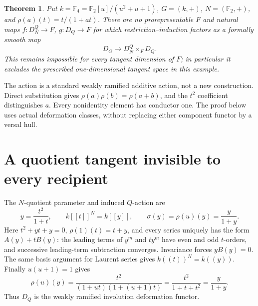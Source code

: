 \documentclass[11pt]{article}
\newtheorem{theorem}{Theorem}
\newcommand{\F}{\mathbb F}
\begin{document}
\begin{theorem}\label{thm:noF}
Put $k=\F_4=\F_2[u]/(u^2+u+1)$, $G=(k,+)$, $N=(\F_2,+)$, and
$\rho(a)(t)=t/(1+at)$. There are no prorepresentable $F$ and natural maps
$f:D_N^Q\to F$, $g:D_Q\to F$ for which restriction--induction factors as a
formally smooth map
\[
 D_G\longrightarrow D_N^Q\times_F D_Q.
\]
This remains impossible for every tangent dimension of $F$; in particular
it excludes the prescribed one-dimensional tangent space in this example.
\end{theorem}

The action is a standard weakly ramified additive action, not a new
construction. Direct substitution gives $\rho(a)\rho(b)=\rho(a+b)$, and the
$t^2$ coefficient distinguishes $a$. Every nonidentity element has conductor
one. The proof below uses actual deformation classes, without replacing
either component functor by a versal hull.

\section{A quotient tangent invisible to every recipient}
The $N$-quotient parameter and induced $Q$-action are
\[
 y=\frac{t^2}{1+t},\qquad k[[t]]^N=k[[y]],\qquad
 \sigma(y)=\rho(u)(y)=\frac{y}{1+y}.
\]
Here $t^2+yt+y=0$, $\rho(1)(t)=t+y$, and every series uniquely has the form
$A(y)+tB(y)$: the leading terms of $y^m$ and $ty^m$ have even and odd
$t$-orders, and successive leading-term subtraction converges.
Invariance forces $yB(y)=0$. The same basis argument for Laurent series
gives $k((t))^N=k((y))$. Finally $u(u+1)=1$ gives
\[
 \rho(u)(y)=\frac{t^2}{(1+ut)(1+(u+1)t)}
            =\frac{t^2}{1+t+t^2}=\frac{y}{1+y}.
\]
Thus $D_Q$ is the weakly ramified involution deformation functor.
\end{document}
